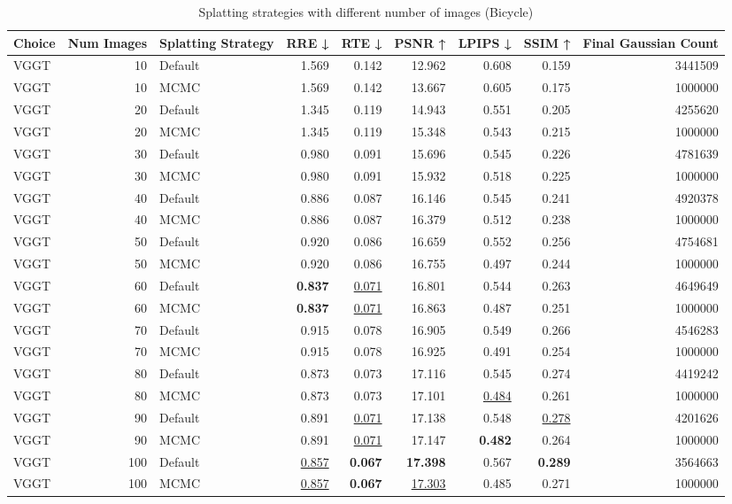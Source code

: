 \begin{table}[H]
\caption{Splatting strategies with different number of images (Bicycle)}
\label{tab:09_splatting_strategy_bicycle}
\begin{tabular}{lrlrrrrrr}
\toprule
Choice & Num Images & Splatting Strategy & RRE ↓ & RTE ↓ & PSNR ↑ & LPIPS ↓ & SSIM ↑ & Final Gaussian Count \\
\midrule
VGGT & 10 & Default & 1.569 & 0.142 & 12.962 & 0.608 & 0.159 & 3441509 \\
VGGT & 10 & MCMC & 1.569 & 0.142 & 13.667 & 0.605 & 0.175 & 1000000 \\
VGGT & 20 & Default & 1.345 & 0.119 & 14.943 & 0.551 & 0.205 & 4255620 \\
VGGT & 20 & MCMC & 1.345 & 0.119 & 15.348 & 0.543 & 0.215 & 1000000 \\
VGGT & 30 & Default & 0.980 & 0.091 & 15.696 & 0.545 & 0.226 & 4781639 \\
VGGT & 30 & MCMC & 0.980 & 0.091 & 15.932 & 0.518 & 0.225 & 1000000 \\
VGGT & 40 & Default & 0.886 & 0.087 & 16.146 & 0.545 & 0.241 & 4920378 \\
VGGT & 40 & MCMC & 0.886 & 0.087 & 16.379 & 0.512 & 0.238 & 1000000 \\
VGGT & 50 & Default & 0.920 & 0.086 & 16.659 & 0.552 & 0.256 & 4754681 \\
VGGT & 50 & MCMC & 0.920 & 0.086 & 16.755 & 0.497 & 0.244 & 1000000 \\
VGGT & 60 & Default & \textbf{0.837} & \underline{0.071} & 16.801 & 0.544 & 0.263 & 4649649 \\
VGGT & 60 & MCMC & \textbf{0.837} & \underline{0.071} & 16.863 & 0.487 & 0.251 & 1000000 \\
VGGT & 70 & Default & 0.915 & 0.078 & 16.905 & 0.549 & 0.266 & 4546283 \\
VGGT & 70 & MCMC & 0.915 & 0.078 & 16.925 & 0.491 & 0.254 & 1000000 \\
VGGT & 80 & Default & 0.873 & 0.073 & 17.116 & 0.545 & 0.274 & 4419242 \\
VGGT & 80 & MCMC & 0.873 & 0.073 & 17.101 & \underline{0.484} & 0.261 & 1000000 \\
VGGT & 90 & Default & 0.891 & \underline{0.071} & 17.138 & 0.548 & \underline{0.278} & 4201626 \\
VGGT & 90 & MCMC & 0.891 & \underline{0.071} & 17.147 & \textbf{0.482} & 0.264 & 1000000 \\
VGGT & 100 & Default & \underline{0.857} & \textbf{0.067} & \textbf{17.398} & 0.567 & \textbf{0.289} & 3564663 \\
VGGT & 100 & MCMC & \underline{0.857} & \textbf{0.067} & \underline{17.303} & 0.485 & 0.271 & 1000000 \\
\bottomrule
\end{tabular}
\end{table}
